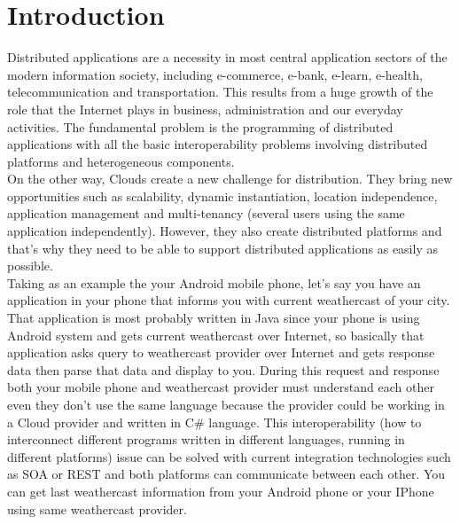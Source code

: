 
\chapter{Introduction}
\label{chapter:introduction}

Distributed applications are a necessity in most central application sectors of the modern information society,
including e-commerce, e-bank, e-learn, e-health, telecommunication and transportation\citep{thesis:introduction1}. This results from a huge
growth of the role that the Internet plays in business, administration and our everyday activities.
The fundamental problem is the programming of distributed applications with all the basic interoperability problems
involving distributed platforms and heterogeneous components.\\

On the other way, Clouds create a new challenge for distribution. They bring new opportunities such as scalability,
dynamic instantiation, location independence, application management and multi-tenancy (several users using the same
application independently)\citep{thesis:introduction2}. However, they also create distributed platforms and that’s why they need to be able to
support distributed applications as easily as possible.\\

Taking as an example the your Android mobile phone, let's say you have an application in your phone that informs you with current
weathercast of your city. That application is most probably written in Java since your phone is using Android system and gets
current weathercast over Internet, so basically that application asks query to weathercast provider over Internet and gets
response data then parse that data and display to you. During this request and response both your mobile phone and weathercast
provider must understand each other even they don’t use the same language because the provider could be working in a Cloud
provider and written in C\# language. This interoperability (how to interconnect different programs written in different
languages, running in different platforms) issue can be solved with current integration technologies such as SOA or REST and both
platforms can communicate between each other. You can get last weathercast information from your Android phone or your IPhone
using same weathercast provider.\\

